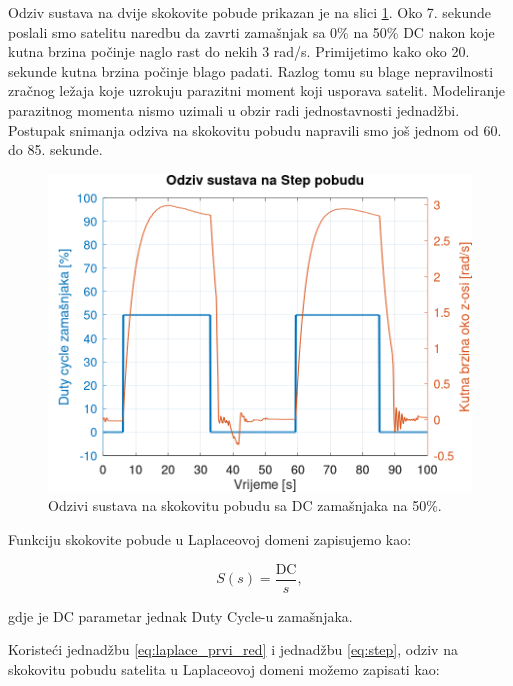 \documentclass[times, utf8, diplomski, numeric]{templates/template}
\begin{document}
{{{            Odziv sustava na dvije skokovite pobude prikazan je na slici \ref{fig:step_response}. Oko 7. sekunde poslali smo satelitu naredbu da zavrti zamašnjak sa 0\% na 50\% DC nakon koje kutna brzina počinje naglo rast do nekih 3 rad/s. Primijetimo kako oko 20. sekunde kutna brzina počinje blago padati. Razlog tomu su blage nepravilnosti zračnog ležaja koje uzrokuju parazitni moment koji usporava satelit. Modeliranje parazitnog momenta nismo uzimali u obzir radi jednostavnosti jednadžbi. Postupak snimanja odziva na skokovitu pobudu napravili smo još jednom od 60. do 85. sekunde.

            \begin{figure}[h!]
            \centering
            \includegraphics[width=1.0\textwidth]{other/step_response.png}
            \caption{Odzivi sustava na skokovitu pobudu sa DC zamašnjaka na 50\%.}
            \label{fig:step_response}
            \end{figure}

            Funkciju skokovite pobude u Laplaceovoj domeni zapisujemo kao:

            \begin{equation}
            \label{eq:step}
                S(s) = \frac{\text{DC}}{s},
            \end{equation}

            gdje je $\text{DC}$ parametar jednak Duty Cycle-u zamašnjaka.

            Koristeći jednadžbu \ref{eq:laplace_prvi_red} i jednadžbu \ref{eq:step}, odziv na skokovitu pobudu satelita u Laplaceovoj domeni možemo zapisati kao:

}}}
\end{document}
